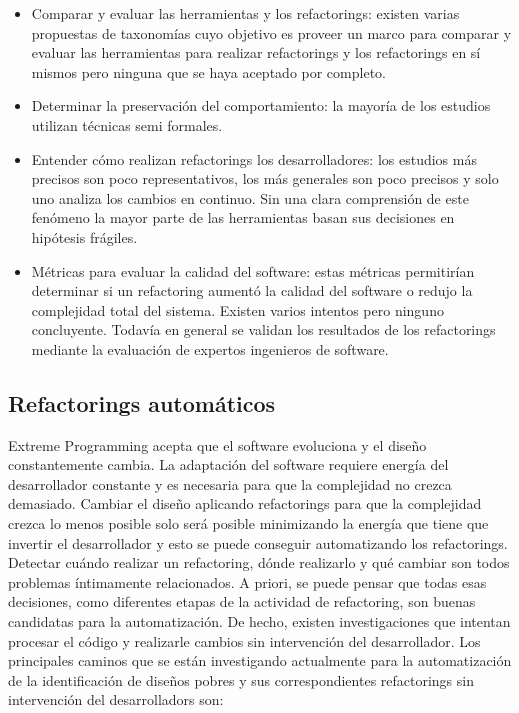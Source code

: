\begin{itemize}
    \item Comparar y evaluar las herramientas y los refactorings: existen varias propuestas de taxonomías cuyo
    objetivo es proveer un marco para comparar y evaluar las herramientas para realizar refactorings y los
    refactorings en sí mismos pero ninguna que se haya aceptado por completo.
    \item Determinar la preservación del comportamiento: la mayoría de los estudios utilizan
    técnicas semi formales.
    \item Entender cómo realizan refactorings los desarrolladores: los estudios más precisos son
    poco representativos, los más generales son poco precisos y solo uno analiza los cambios en
    continuo. Sin una clara comprensión de este fenómeno la mayor parte de las herramientas basan
    sus decisiones en hipótesis frágiles.
    \item Métricas para evaluar la calidad del software: estas métricas permitirían determinar si un
    refactoring aumentó la calidad del software o redujo la complejidad total del sistema. Existen 
    varios intentos pero ninguno concluyente. Todavía en general se validan los resultados de los
    refactorings mediante la evaluación de expertos ingenieros de software.
\end{itemize}


\subsection{Refactorings automáticos}
Extreme Programming acepta que el software evoluciona y el diseño constantemente cambia. La
adaptación del software requiere energía del desarrollador constante y es necesaria para que la
complejidad no crezca demasiado. Cambiar el diseño aplicando refactorings para que la complejidad
crezca lo menos posible solo será posible minimizando la energía que tiene que invertir el
desarrollador y esto se puede conseguir automatizando los refactorings.
Detectar cuándo realizar un refactoring, dónde realizarlo y qué cambiar son todos problemas
íntimamente relacionados. A priori, se puede pensar que todas esas decisiones, como diferentes
etapas de la actividad de refactoring, son buenas candidatas para la automatización. De hecho,
existen investigaciones que intentan procesar el código y realizarle cambios sin intervención del
desarrollador. 
Los principales caminos que se están investigando actualmente para la automatización de la
identificación de diseños pobres y sus correspondientes refactorings sin intervención del
desarrolladors son:


